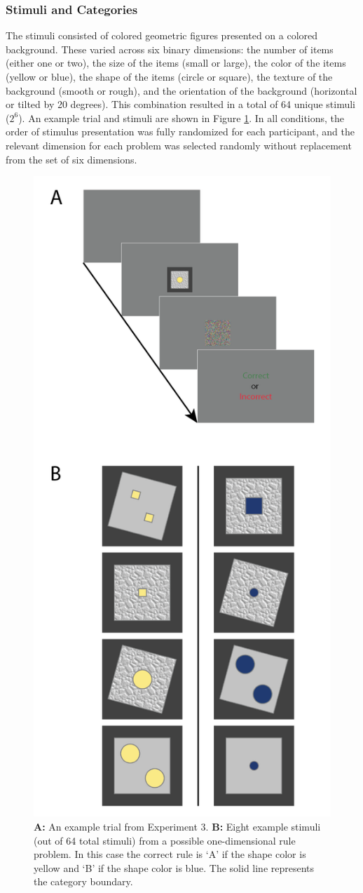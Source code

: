 \documentclass[doc, floatsintext]{apa7}
\begin{document}
\subsubsection{Stimuli and Categories}
The stimuli consisted of colored geometric figures presented
on a colored background. These varied across six binary
dimensions: the number of items (either one or two), the
size of the items (small or large), the color of the items
(yellow or blue), the shape of the items (circle or square),
the texture of the background (smooth or rough), and the
orientation of the background (horizontal or tilted by 20
degrees). This combination resulted in a total of 64 unique
stimuli ($2^6$). An example trial and stimuli are shown in
Figure \ref{fig_design_exp_2}. In all conditions, the order
of stimulus presentation was fully randomized for each
participant, and the relevant dimension for each problem was
selected randomly without replacement from the set of six
dimensions.

\begin{figure}
  \centering
  \includegraphics[width=.5\textwidth]{../figures/fig_design_exp_2.png}
  \caption{
      \textbf{A:} An example trial from Experiment 3.
      \textbf{B:} Eight example stimuli (out of 64 total
      stimuli) from a possible one-dimensional rule problem.
      In this case the correct rule is `A' if the shape
      color is yellow and `B' if the shape color is blue.
      The solid line represents the category boundary.
}
  \label{fig_design_exp_2}
\end{figure}
\end{document}
